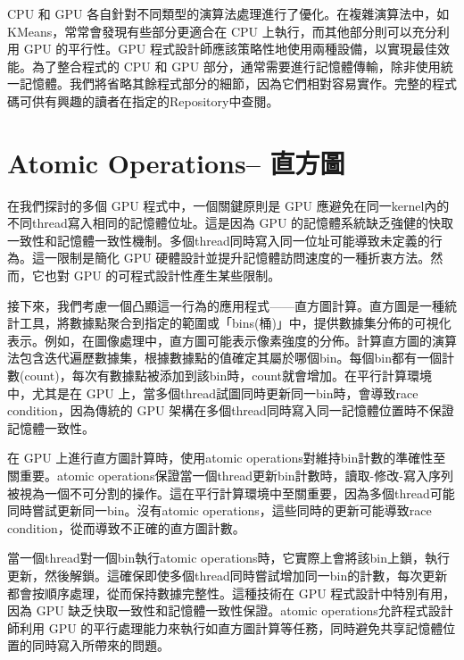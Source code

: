 \vspace{1em}
CPU 和 GPU 各自針對不同類型的演算法處理進行了優化。在複雜演算法中，如 KMeans，常常會發現有些部分更適合在 CPU 上執行，而其他部分則可以充分利用 GPU 的平行性。GPU 程式設計師應該策略性地使用兩種設備，以實現最佳效能。為了整合程式的 CPU 和 GPU 部分，通常需要進行記憶體傳輸，除非使用統一記憶體。我們將省略其餘程式部分的細節，因為它們相對容易實作。完整的程式碼可供有興趣的讀者在指定的Repository中查閱。

\section{ Atomic Operations– 直方圖}
在我們探討的多個 GPU 程式中，一個關鍵原則是 GPU 應避免在同一kernel內的不同thread寫入相同的記憶體位址。這是因為 GPU 的記憶體系統缺乏強健的快取一致性和記憶體一致性機制。多個thread同時寫入同一位址可能導致未定義的行為。這一限制是簡化 GPU 硬體設計並提升記憶體訪問速度的一種折衷方法。然而，它也對 GPU 的可程式設計性產生某些限制。

\vspace{1em}
接下來，我們考慮一個凸顯這一行為的應用程式——直方圖計算。直方圖是一種統計工具，將數據點聚合到指定的範圍或「bins(桶)」中，提供數據集分佈的可視化表示。例如，在圖像處理中，直方圖可能表示像素強度的分佈。計算直方圖的演算法包含迭代遍歷數據集，根據數據點的值確定其屬於哪個bin。每個bin都有一個計數(count)，每次有數據點被添加到該bin時，count就會增加。在平行計算環境中，尤其是在 GPU 上，當多個thread試圖同時更新同一bin時，會導致race condition，因為傳統的 GPU 架構在多個thread同時寫入同一記憶體位置時不保證記憶體一致性。

\vspace{1em}
在 GPU 上進行直方圖計算時，使用atomic operations對維持bin計數的準確性至關重要。atomic operations保證當一個thread更新bin計數時，讀取-修改-寫入序列被視為一個不可分割的操作。這在平行計算環境中至關重要，因為多個thread可能同時嘗試更新同一bin。沒有atomic operations，這些同時的更新可能導致race condition，從而導致不正確的直方圖計數。

\vspace{1em}
當一個thread對一個bin執行atomic operations時，它實際上會將該bin上鎖，執行更新，然後解鎖。這確保即使多個thread同時嘗試增加同一bin的計數，每次更新都會按順序處理，從而保持數據完整性。這種技術在 GPU 程式設計中特別有用，因為 GPU 缺乏快取一致性和記憶體一致性保證。atomic operations允許程式設計師利用 GPU 的平行處理能力來執行如直方圖計算等任務，同時避免共享記憶體位置的同時寫入所帶來的問題。

